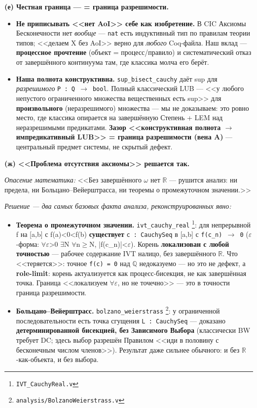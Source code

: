 \documentclass[11pt,a4paper]{article}
\begin{document}
\textbf{(е) Честная граница --- = граница разрешимости.}
\begin{itemize}
\item \textbf{Не приписывать <<нет AoI>> себе как изобретение.} В CIC Аксиомы Бесконечности нет \emph{вообще} --- \texttt{nat} есть индуктивный тип по правилам теории типов; <<делаем X без AoI>> верно для \emph{любого} Coq-файла. Наш вклад --- \textbf{процессное прочтение} (объект = процесс/правило) и систематический отказ от завершённого континуума там, где классика молча его берёт.
\item \textbf{Наша полнота конструктивна.} \texttt{sup\_\allowbreak{}bisect\_\allowbreak{}cauchy} даёт sup для \emph{разрешимого} \texttt{P : Q $\to$ bool}. Полный классический LUB --- <<у любого непустого ограниченного множества вещественных есть sup>> для \textbf{произвольного} (неразрешимого) множества --- мы не доказываем: это ровно место, где классика опирается на завершённую Степень + LEM над неразрешимыми предикатами. \textbf{Зазор <<конструктивная полнота $\to$ импредикативный LUB>> = граница разрешимости (вена A)} --- центральный предмет системы, не скрытый дефект.
\end{itemize}

\textbf{(ж) <<Проблема отсутствия аксиомы>> решается так.}

\emph{Опасение математика:} <<Без завершённого $\omega$ нет $\mathbb{R}$ --- рушится анализ: ни предела, ни Больцано--Вейерштрасса, ни теоремы о промежуточном значении.>>

\emph{Решение --- два самых базовых факта анализа, реконструированных явно:}

\begin{itemize}
\item \textbf{Теорема о промежуточном значении.} \texttt{ivt\_\allowbreak{}cauchy\_\allowbreak{}real} \footnote{\texttt{IVT\_\allowbreak{}Cauchy\allowbreak{}Real.v}}: для непрерывной f на [a,b] с f(a)<0<f(b) \textbf{существует} \texttt{c : Cauchy\allowbreak{}Seq} в [a,b] с \texttt{f(c\_\allowbreak{}n) $\to$ 0} ($\varepsilon$-форма: $\forall$$\varepsilon$>0 $\exists$N $\forall$n$\ge$N, |f(c\_n)|<$\varepsilon$). Корень \textbf{локализован с любой точностью} --- рабочее содержание IVT налицо, без завершённого $\mathbb{R}$. Что <<теряется>>: точное \texttt{f(c) = 0} над $\mathbb{Q}$ недоказуемо --- но это не дефект, а \textbf{role-limit}: корень актуализуется как процесс-бисекция, не как завершённая точка. Граница <<локализуем $\forall$$\varepsilon$, но не точечно>> --- это в точности граница разрешимости.
\item \textbf{Больцано--Вейерштрасс.} \texttt{bolzano\_\allowbreak{}weierstrass} \footnote{\texttt{analysis/\allowbreak{}Bolzano\allowbreak{}Weierstrass.v}}: у ограниченной последовательности есть точка сгущения \texttt{L : Cauchy\allowbreak{}Seq} --- доказано \textbf{детерминированной бисекцией, без Зависимого Выбора} (классически BW требует DC; здесь выбор разрешён Правилом <<иди в половину с бесконечным числом членов>>). Результат даже сильнее обычного: и без $\mathbb{R}$-как-объекта, и без выбора.
\end{itemize}
\end{document}
